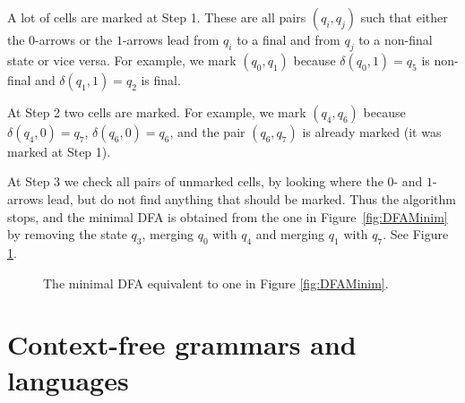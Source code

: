 \begin{page}
\begin{exl}
A lot of cells are marked at Step 1.
These are all pairs $(q_i, q_j)$ such that either the $0$-arrows or the $1$-arrows lead from $q_i$ to a final and from $q_j$ to a non-final state or vice versa.
For example, we mark $(q_0, q_1)$ because $\delta(q_0, 1) = q_5$ is non-final and $\delta(q_1, 1) = q_2$ is final.

At Step 2 two cells are marked.
For example, we mark $(q_4, q_6)$ because $\delta(q_4, 0) = q_7$, $\delta(q_6, 0) = q_6$, and the pair $(q_6, q_7)$ is already marked (it was marked at Step 1).

At Step 3 we check all pairs of unmarked cells, by looking where the $0$- and $1$-arrows lead, but do not find anything that should be marked.
Thus the algorithm stops, and the minimal DFA is obtained from the one in Figure~\ref{fig:DFAMinim} by removing the state $q_3$,
merging $q_0$ with $q_4$ and merging $q_1$ with $q_7$. See Figure \ref{fig:DFAMinimResult}.

\begin{figure}[ht]
\begin{center}

\end{center}
\caption{The minimal DFA equivalent to one in Figure \ref{fig:DFAMinim}.}
\label{fig:DFAMinimResult}
\end{figure}
\end{exl}

\end{page}

\begin{page}
\setcounter{section}{5}
\setcounter{subsection}{0}
\setcounter{dfn}{9}
\label{portion:1203}





\newpage


\end{page}

\begin{page}
\setcounter{section}{5}
\setcounter{subsection}{1}
\setcounter{dfn}{0}
\label{portion:1205}

\section{Context-free grammars and languages}

\end{page}


